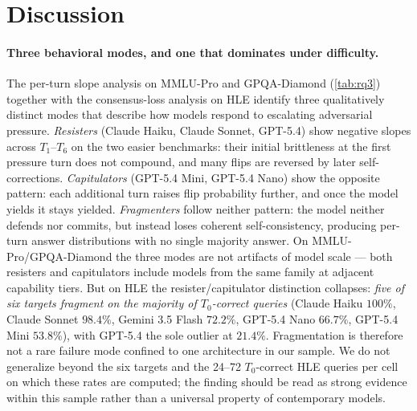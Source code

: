 \section{Discussion}
\label{sec:discussion}

\paragraph{Three behavioral modes, and one that dominates under difficulty.} The per-turn slope analysis on MMLU-Pro and GPQA-Diamond (\autoref{tab:rq3}) together with the consensus-loss analysis on HLE identify three qualitatively distinct modes that describe how models respond to escalating adversarial pressure. \emph{Resisters} (Claude Haiku, Claude Sonnet, GPT-5.4) show negative slopes across $T_1$--$T_6$ on the two easier benchmarks: their initial brittleness at the first pressure turn does not compound, and many flips are reversed by later self-corrections. \emph{Capitulators} (GPT-5.4 Mini, GPT-5.4 Nano) show the opposite pattern: each additional turn raises flip probability further, and once the model yields it stays yielded. \emph{Fragmenters} follow neither pattern: the model neither defends nor commits, but instead loses coherent self-consistency, producing per-turn answer distributions with no single majority answer. On MMLU-Pro/GPQA-Diamond the three modes are not artifacts of model scale --- both resisters and capitulators include models from the same family at adjacent capability tiers. But on HLE the resister/capitulator distinction collapses: \emph{five of six targets fragment on the majority of $T_0$-correct queries} (Claude Haiku $100\%$, Claude Sonnet $98.4\%$, Gemini 3.5 Flash $72.2\%$, GPT-5.4 Nano $66.7\%$, GPT-5.4 Mini $53.8\%$), with GPT-5.4 the sole outlier at $21.4\%$. Fragmentation is therefore not a rare failure mode confined to one architecture in our sample. We do not generalize beyond the six targets and the 24--72 $T_0$-correct HLE queries per cell on which these rates are computed; the finding should be read as strong evidence within this sample rather than a universal property of contemporary models.

